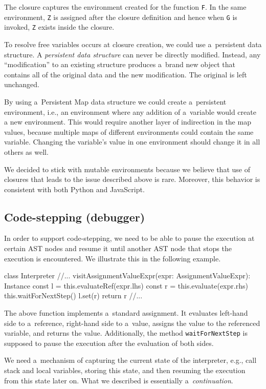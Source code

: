 The closure captures the environment created for the function \texttt{F}. In the same environment, \texttt{Z} is assigned after the closure definition and hence
when \texttt{G} is invoked, \texttt{Z} exists inside the closure.

To resolve free variables occurs at closure creation, we could use a~persistent data structure. A \emph{persistent data structure} can never be directly modified. Instead, any ``modification''
to an existing structure produces a~brand new object that contains all of the original data and the new modification. The original is left unchanged.

By using a~Persistent Map data structure we could create a~persistent environment, i.e., an environment where any addition of a~variable would create 
a new environment. This would require another layer of indirection in the map values, because multiple maps of different environments could contain the same
variable. Changing the variable's value in one environment should change it in all others as well.

We decided to stick with mutable environments because we believe that use of closures that leads to the issue described above is rare. Moreover, this behavior
is consistent with both Python and JavaScript.

\subsection{Code-stepping (debugger)}
In order to support code-stepping, we need to be able to pause the execution at certain AST nodes and resume it until another AST node that stops the execution
is encountered. We illustrate this in the following example.
\begin{code}
class Interpreter {
    //...
    visitAssignmentValueExpr(expr: AssignmentValueExpr): Instance {
        const l = this.evaluateRef(expr.lhs)
        const r = this.evaluate(expr.rhs)
        this.waitForNextStep()
        l.set(r)
        return r
    }
    //...
}
\end{code}
The above function implements a~standard assignment. It evaluates left-hand side to a~reference, right-hand side to a~value, assigns the value to the
referenced variable, and returns the value. Additionally, the method \texttt{waitForNextStep} is supposed to pause the execution after the evaluation of 
both sides.

We need a~mechanism of capturing the current state of the interpreter, e.g., call stack and local variables, storing this state, and then resuming the execution
from this state later on. What we described is essentially a~\emph{continuation}.

